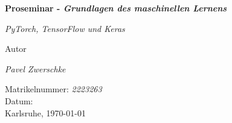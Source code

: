 \begin{titlepage}
\begin{center}
	\vspace{3em}	
    {\Huge\bfseries Proseminar - \textit{Grundlagen des maschinellen Lernens}\par}
    \vspace{2em}
    {\huge \textit{PyTorch, TensorFlow und Keras} \par}
    \vspace{3em}
    Autor\\
	\vspace{1em}
    {\Large \textit{Pavel Zwerschke}\par}
    \vspace{1em}
    Matrikelnummer: \textit{2223263}\\
    \vspace{3em}
    Datum:\\
	\vspace{1em}
    Karlsruhe, \today
\end{center}
\end{titlepage}